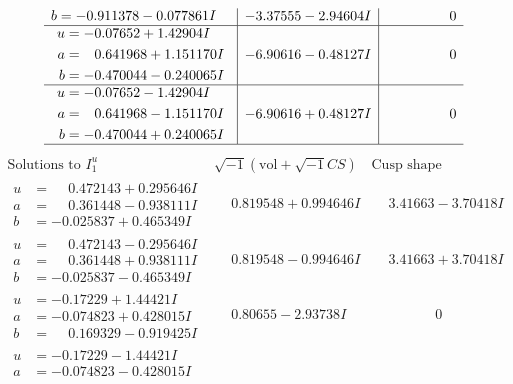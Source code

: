 \documentclass[1p]{elsarticle_modified}
\theoremstyle{definition}
\newcommand{\I}{\sqrt{-1}}
\begin{document}
$$\begin{array}{c|c|c}
\begin{aligned}
b &= -0.911378 - 0.077861 I\end{aligned}
 & -3.37555 - 2.94604 I & \phantom{-0.000000 } 0 \\ \hline\begin{aligned}
u &= -0.07652 + 1.42904 I \\
a &= \phantom{-}0.641968 + 1.151170 I \\
b &= -0.470044 - 0.240065 I\end{aligned}
 & -6.90616 - 0.48127 I & \phantom{-0.000000 } 0 \\ \hline\begin{aligned}
u &= -0.07652 - 1.42904 I \\
a &= \phantom{-}0.641968 - 1.151170 I \\
b &= -0.470044 + 0.240065 I\end{aligned}
 & -6.90616 + 0.48127 I & \phantom{-0.000000 } 0\\
 \hline 
 \end{array}$$\newpage$$\begin{array}{c|c|c}  
\text{Solutions to }I^u_{1}& \I (\text{vol} + \sqrt{-1}CS) & \text{Cusp shape}\\
 \hline 
\begin{aligned}
u &= \phantom{-}0.472143 + 0.295646 I \\
a &= \phantom{-}0.361448 - 0.938111 I \\
b &= -0.025837 + 0.465349 I\end{aligned}
 & \phantom{-}0.819548 + 0.994646 I & \phantom{-}3.41663 - 3.70418 I \\ \hline\begin{aligned}
u &= \phantom{-}0.472143 - 0.295646 I \\
a &= \phantom{-}0.361448 + 0.938111 I \\
b &= -0.025837 - 0.465349 I\end{aligned}
 & \phantom{-}0.819548 - 0.994646 I & \phantom{-}3.41663 + 3.70418 I \\ \hline\begin{aligned}
u &= -0.17229 + 1.44421 I \\
a &= -0.074823 + 0.428015 I \\
b &= \phantom{-}0.169329 - 0.919425 I\end{aligned}
 & \phantom{-}0.80655 - 2.93738 I & \phantom{-0.000000 } 0 \\ \hline\begin{aligned}
u &= -0.17229 - 1.44421 I \\
a &= -0.074823 - 0.428015 I \\

\end{aligned}
\end{array}$$
\end{document}
